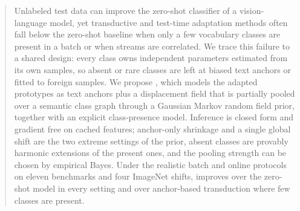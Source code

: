 \begin{abstract}
Unlabeled test data can improve the zero-shot classifier of a vision-language model, yet transductive and test-time adaptation methods often fall below the zero-shot baseline when only a few vocabulary classes are present in a batch or when streams are correlated. We trace this failure to a shared design: every class owns independent parameters estimated from its own samples, so absent or rare classes are left at biased text anchors or fitted to foreign samples. We propose \method, which models the adapted prototypes as text anchors plus a displacement field that is partially pooled over a semantic class graph through a Gaussian Markov random field prior, together with an explicit class-presence model. Inference is closed form and gradient free on cached features; anchor-only shrinkage and a single global shift are the two extreme settings of the prior, absent classes are provably harmonic extensions of the present ones, and the pooling strength can be chosen by empirical Bayes. Under the realistic batch and online protocols on eleven benchmarks and four ImageNet shifts, \method improves over the zero-shot model in every setting and over anchor-based transduction where few classes are present.
\end{abstract}
